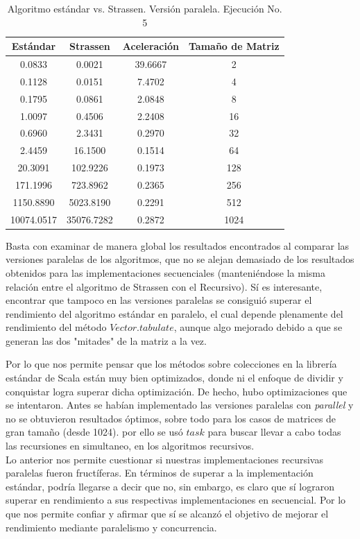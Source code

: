 \documentclass{article}
\begin{document}
\begin{table}[ht]
\centering
\begin{tabular}{|c|c|c|c|}
\hline
\textbf{Estándar} & \textbf{Strassen} & \textbf{Aceleración} & \textbf{Tamaño de Matriz} \\
\hline
0.0833 & 0.0021 & 39.6667 & 2 \\
0.1128 & 0.0151 & 7.4702 & 4 \\
0.1795 & 0.0861 & 2.0848 & 8 \\
1.0097 & 0.4506 & 2.2408 & 16 \\
0.6960 & 2.3431 & 0.2970 & 32 \\
2.4459 & 16.1500 & 0.1514 & 64 \\
20.3091 & 102.9226 & 0.1973 & 128 \\
171.1996 & 723.8962 & 0.2365 & 256 \\
1150.8890 & 5023.8190 & 0.2291 & 512 \\
10074.0517 & 35076.7282 & 0.2872 & 1024 \\
\hline
\end{tabular}
\caption{Algoritmo estándar vs. Strassen. Versión paralela. Ejecución No. 5}
\end{table}


Basta con examinar de manera global los resultados encontrados al comparar las versiones paralelas de los algoritmos, que no se alejan demasiado de los resultados obtenidos para las implementaciones secuenciales (manteniéndose la misma relación entre el algoritmo de Strassen con el Recursivo). Sí es interesante, encontrar que tampoco en las versiones paralelas se consiguió superar el rendimiento del algoritmo estándar en paralelo, el cual depende plenamente del rendimiento del método \(Vector.tabulate\), aunque algo mejorado debido a que se generan las dos "mitades" de la matriz a la vez.

Por lo que nos permite pensar que los métodos sobre colecciones en la librería estándar de Scala están muy bien optimizados, donde ni el enfoque de dividir y conquistar logra superar dicha optimización. De hecho, hubo optimizaciones que se intentaron. Antes se habían implementado las versiones paralelas con \textit{parallel} y no se obtuvieron resultados óptimos, sobre todo para los casos de matrices de gran tamaño (desde 1024). por ello se usó \(task\) para buscar llevar a cabo todas las recursiones en simultaneo, en los algoritmos recursivos.\\

Lo anterior nos permite cuestionar si nuestras implementaciones recursivas paralelas fueron fructíferas. En términos de superar a la implementación estándar, podría llegarse a decir que no, sin embargo, es claro que sí lograron superar en rendimiento a sus respectivas implementaciones en secuencial. Por lo que nos permite confiar y afirmar que sí se alcanzó el objetivo de mejorar el rendimiento mediante paralelismo y concurrencia.\\
\end{document}
